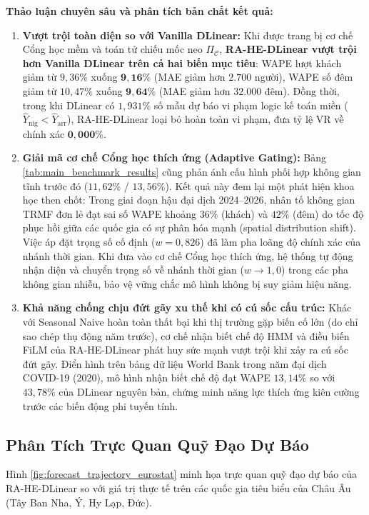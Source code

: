 \noindent \textbf{Thảo luận chuyên sâu và phân tích bản chất kết quả:}
\begin{enumerate}
    \item \textbf{Vượt trội toàn diện so với Vanilla DLinear:} Khi được trang bị cơ chế Cổng học mềm và toán tử chiếu mốc neo $\Pi_{\mathcal{C}}$, \textbf{RA-HE-DLinear vượt trội hơn Vanilla DLinear trên cả hai biến mục tiêu}: WAPE lượt khách giảm từ $9{,}36\%$ xuống $\mathbf{9{,}16\%}$ (MAE giảm hơn $2.700$ người), WAPE số đêm giảm từ $10{,}47\%$ xuống $\mathbf{9{,}64\%}$ (MAE giảm hơn $32.000$ đêm). Đồng thời, trong khi DLinear có $1{,}931\%$ số mẫu dự báo vi phạm logic kế toán miền ($\hat{Y}_{\text{nig}} < \hat{Y}_{\text{arr}}$), RA-HE-DLinear loại bỏ hoàn toàn vi phạm, đưa tỷ lệ VR về chính xác $\mathbf{0{,}000\%}$.
    \item \textbf{Giải mã cơ chế Cổng học thích ứng (Adaptive Gating):} Bảng \ref{tab:main_benchmark_results} cũng phản ánh cấu hình phối hợp không gian tĩnh trước đó ($11{,}62\%$ / $13{,}56\%$). Kết quả này đem lại một phát hiện khoa học then chốt: Trong giai đoạn hậu đại dịch 2024--2026, nhân tố không gian TRMF đơn lẻ đạt sai số WAPE khoảng $36\%$ (khách) và $42\%$ (đêm) do tốc độ phục hồi giữa các quốc gia có sự phân hóa mạnh (spatial distribution shift). Việc áp đặt trọng số cố định ($w=0{,}826$) đã làm pha loãng độ chính xác của nhánh thời gian. Khi đưa vào cơ chế Cổng học thích ứng, hệ thống tự động nhận diện và chuyển trọng số về nhánh thời gian ($w \to 1{,}0$) trong các pha không gian nhiễu, bảo vệ vững chắc mô hình không bị suy giảm hiệu năng.
    \item \textbf{Khả năng chống chịu đứt gãy xu thế khi có cú sốc cấu trúc:} Khác với Seasonal Naive hoàn toàn thất bại khi thị trường gặp biến cố lớn (do chỉ sao chép thụ động năm trước), cơ chế nhận biết chế độ HMM và điều biến FiLM của RA-HE-DLinear phát huy sức mạnh vượt trội khi xảy ra cú sốc đứt gãy. Điển hình trên bảng dữ liệu World Bank trong năm đại dịch COVID-19 (2020), mô hình nhận biết chế độ đạt WAPE $13{,}14\%$ so với $43{,}78\%$ của DLinear nguyên bản, chứng minh năng lực thích ứng kiên cường trước các biến động phi tuyến tính.
\end{enumerate}

\subsection{Phân Tích Trực Quan Quỹ Đạo Dự Báo}
Hình \ref{fig:forecast_trajectory_eurostat} minh họa trực quan quỹ đạo dự báo của RA-HE-DLinear so với giá trị thực tế trên các quốc gia tiêu biểu của Châu Âu (Tây Ban Nha, Ý, Hy Lạp, Đức). 

